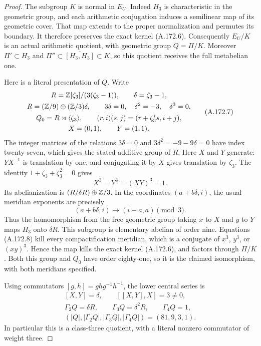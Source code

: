 \begin{proof}
The subgroup \(K\) is normal in \(E_U\).  Indeed \(H_3\)
is characteristic in the geometric group, and each arithmetic
conjugation induces a semilinear map of its geometric cover.
That map extends to the proper normalization and permutes its
boundary.  It therefore preserves the exact kernel (A.172.6).
Consequently \(E_U/K\) is an actual arithmetic quotient,
with geometric group \(Q=\Pi/K\).  Moreover
\(\Pi'\subset H_3\) and
\(\Pi''\subset\overline{[H_3,H_3]}\subset K\), so this
quotient receives the full metabelian one.

Here is a literal presentation of \(Q\).  Write
\[
 \begin{gathered}
 R=\mathbb Z[\zeta_3]/(3(\zeta_3-1)),\qquad \delta=\zeta_3-1,\\
 R=(\mathbb Z/9)\oplus(\mathbb Z/3)\delta,
             \qquad 3\delta=0,\quad\delta^2=-3,\quad\delta^3=0,\\
 Q_0=R\rtimes\langle\zeta_3\rangle,
             \qquad (r,i)(s,j)=(r+\zeta_3^is,i+j),\\
 X=(0,1),\qquad Y=(1,1).
 \end{gathered}
\tag{A.172.7}
\]
The integer matrices of the relations \(3\delta=0\) and
\(3\delta^2=-9-9\delta=0\) have index twenty-seven, which
gives the stated additive group of \(R\).
Here \(X\) and \(Y\) generate: \(YX^{-1}\) is translation
by one, and conjugating it by \(X\) gives translation by
\(\zeta_3\).  The identity
\(1+\zeta_3+\zeta_3^2=0\) gives
\[
               X^3=Y^3=(XY)^3=1.
\tag{A.172.8}
\]
Its abelianization is \((R/\delta R)\oplus\mathbb Z/3\).
In the coordinates \((a+b\delta,i)\), the usual meridian
exponents are precisely
\[
              (a+b\delta,i)\longmapsto(i-a,a)\pmod3.
\tag{A.172.9}
\]
Thus the homomorphism from the free geometric group taking
\(x\) to \(X\) and \(y\) to \(Y\) maps \(H_3\) onto
\(\delta R\).  This subgroup is elementary abelian of order
nine.  Equations (A.172.8) kill every compactification meridian,
which is a conjugate of \(x^3\), \(y^3\), or \((xy)^3\).
Hence the map kills the exact kernel (A.172.6), and factors through
\(\Pi/K\).  Both this group and \(Q_0\) have order eighty-one,
so it is the claimed isomorphism, with both meridians specified.

Using commutators \([g,h]=ghg^{-1}h^{-1}\), the lower central
series is
\[
 \begin{gathered}
 [X,Y]=\delta,\qquad [[X,Y],X]=3\ne0,\\
 \Gamma_2Q=\delta R,\qquad
 \Gamma_3Q=\delta^2R,\qquad\Gamma_4Q=1,\\
                  (|Q|,|\Gamma_2Q|,|\Gamma_3Q|,|\Gamma_4Q|)
                             =(81,9,3,1).
 \end{gathered}
\tag{A.172.10}
\]
In particular this is a class-three quotient, with a literal
nonzero commutator of weight three.


\end{proof}
